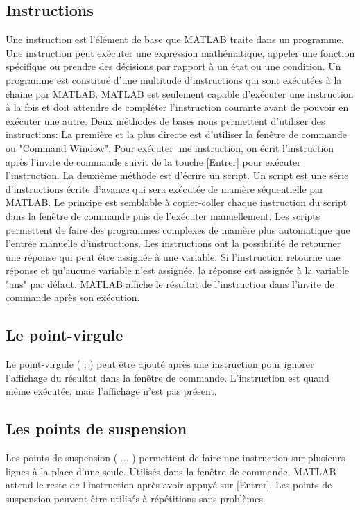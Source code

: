 \documentclass{tufte-handout}
\begin{document}
\subsection{Instructions}
Une instruction est l'élément de base que MATLAB traite dans un programme. Une instruction peut exécuter une expression mathématique, appeler une fonction spécifique ou prendre des décisions par rapport à un état ou une condition.
Un programme est constitué d'une multitude d'instructions qui sont exécutées à la chaine par MATLAB. MATLAB est seulement capable d'exécuter une instruction à la fois et doit attendre de compléter l'instruction courante avant de pouvoir en exécuter une autre.
Deux méthodes de bases nous permettent d'utiliser des instructions:
La première et la plus directe est d'utiliser la fenêtre de commande ou "Command Window". Pour exécuter une instruction, on écrit l'instruction après l'invite de commande suivit de la touche [Entrer] pour exécuter l'instruction.
La deuxième méthode est d'écrire un script. Un script est une série d'instructions écrite d'avance qui sera exécutée de manière séquentielle par MATLAB. Le principe est semblable à copier-coller chaque instruction du script dans la fenêtre de commande puis de l'exécuter manuellement. Les scripts permettent de faire des programmes complexes de manière plus automatique que l'entrée manuelle d'instructions.
Les instructions ont la possibilité de retourner une réponse qui peut être assignée à une variable. Si l'instruction retourne une réponse et qu'aucune variable n'est assignée, la réponse est assignée à la variable "ans" par défaut.
MATLAB affiche le résultat de l'instruction dans l'invite de commande après son exécution.

\subsection{Le point-virgule}
Le point-virgule ( ; ) peut être ajouté après une instruction pour ignorer l'affichage du résultat dans la fenêtre de commande. L'instruction est quand même exécutée, mais l'affichage n'est pas présent.
\subsection{Les points de suspension}
Les points de suspension ( ... ) permettent de faire une instruction sur plusieurs lignes à la place d'une seule. Utilisés dans la fenêtre de commande, MATLAB attend le reste de l'instruction après avoir appuyé sur [Entrer]. Les points de suspension peuvent être utilisés à répétitions sans problèmes.
\end{document}
